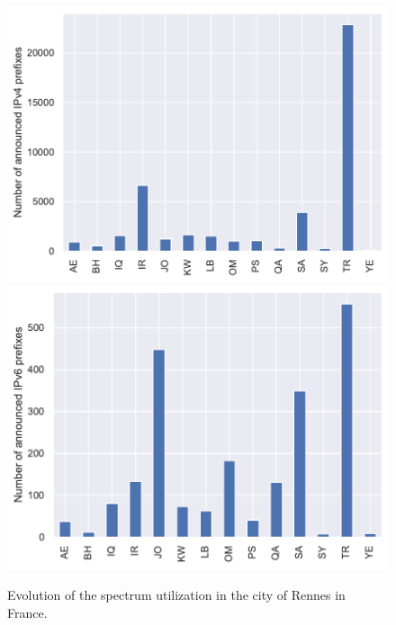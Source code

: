 \documentclass[a4paper,titlepage]{article}
\begin{document}
\begin{figure}
    \centering
    {\includegraphics[width=0.45\linewidth]{../output/prefix-v4.pdf}}
    {\includegraphics[width=0.45\linewidth]{../output/prefix-v6.pdf}}
    \caption{Evolution of the spectrum utilization in the city of Rennes in France.
    \label{fig:perc-antenna-evo}
    }
\end{figure}
\end{document}
